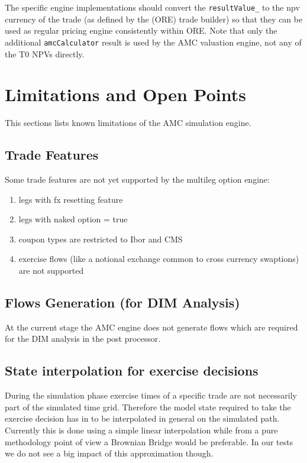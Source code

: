 \documentclass[12pt, a4paper]{article}
\begin{document}
The specific engine implementations should convert the \verb+resultValue_+ to the npv currency of the trade (as defined
by the (ORE) trade builder) so that they can be used as regular pricing engine consistently within ORE. Note that only
the additional \verb+amcCalculator+ result is used by the AMC valuation engine, not any of the T0 NPVs directly.

\section{Limitations and Open Points}

This sections lists known limitations of the AMC simulation engine.

\subsection{Trade Features}\label{sec:limitations_trade_features}

Some trade features are not yet supported by the multileg option engine:

\begin{enumerate}
\item legs with fx resetting feature
\item legs with naked option = true
\item coupon types are restricted to Ibor and CMS
\item exercise flows (like a notional exchange common to cross currency swaptions) are not supported
\end{enumerate}

\subsection{Flows Generation (for DIM Analysis)}

At the current stage the AMC engine does not generate flows which are required for the DIM analysis in the post
processor.

\subsection{State interpolation for exercise decisions}

During the simulation phase exercise times of a specific trade are not necessarily part of the simulated time
grid. Therefore the model state required to take the exercise decision has in to be interpolated in general on the
simulated path. Currently this is done using a simple linear interpolation while from a pure methodology point of view a
Brownian Bridge would be preferable. In our tests we do not see a big impact of this approximation though.
\end{document}

